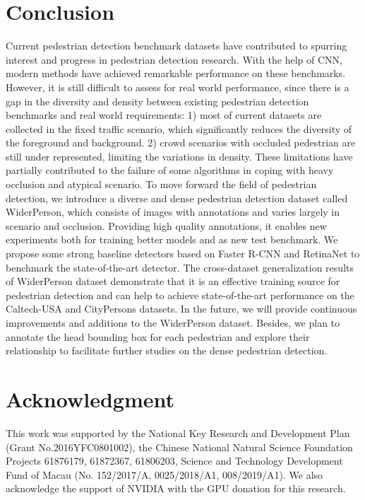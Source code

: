 \documentclass[journal]{IEEEtran}
\begin{document}
\section{Conclusion} \label{6}
Current pedestrian detection benchmark datasets have contributed to spurring interest and progress in pedestrian detection research. With the help of CNN, modern methods have achieved remarkable performance on these benchmarks. However, it is still difficult to assess for real world performance, since there is a gap in the diversity and density between existing pedestrian detection benchmarks and real world requirements: 1) most of current datasets are collected in the fixed traffic scenario, which significantly reduces the diversity of the foreground and background. 2) crowd scenarios with occluded pedestrian are still under represented, limiting the variations in density. These limitations have partially contributed to the failure of some algorithms in coping with heavy occlusion and atypical scenario. To move forward the field of pedestrian detection, we introduce a diverse and dense pedestrian detection dataset called WiderPerson, which consists of  images with  annotations and varies largely in scenario and occlusion. Providing high quality annotations, it enables new experiments both for training better models and as new test benchmark. We propose some strong baseline detectors based on Faster R-CNN and RetinaNet to benchmark the state-of-the-art detector. The cross-dataset generalization results of WiderPerson dataset demonstrate that it is an effective training source for pedestrian detection and can help to achieve state-of-the-art performance on the Caltech-USA and CityPersons datasets. In the future, we will provide continuous improvements and additions to the WiderPerson dataset. Besides, we plan to annotate the head bounding box for each pedestrian and explore their relationship to facilitate further studies on the dense pedestrian detection.

\section*{Acknowledgment}
This work was supported by the National Key Research and Development Plan (Grant No.2016YFC0801002), the Chinese National Natural Science Foundation Projects 61876179, 61872367, 61806203, Science and Technology Development Fund of Macau (No. 152/2017/A, 0025/2018/A1, 008/2019/A1). We also acknowledge the support of NVIDIA with the GPU donation for this research.


\ifCLASSOPTIONcaptionsoff
  \newpage
\fi



\end{document}
